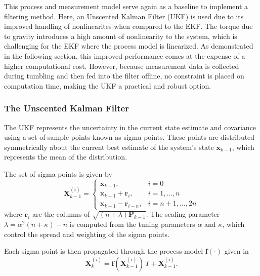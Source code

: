 This process and measurement model serve again as a baseline to implement a filtering method. Here, an Unscented Kalman Filter (UKF) is used due to its improved handling of nonlinearites when compared to the EKF. The torque due to gravity introduces a high amount of nonlinearity to the system, which is challenging for the EKF where the process model is linearized. As demonstrated in the following section, this improved performance comes at the expense of a higher computational cost. However, because measurement data is collected during tumbling and then fed into the filter offline, no constraint is placed on computation time, making the UKF a practical and robust option.

\subsubsection{The Unscented Kalman Filter}

The UKF represents the uncertainty in the current state estimate and covariance using a set of sample points known as sigma points. These points are distributed symmetrically about the current best estimate of the system's state $\bm{x}_{k-1}$, which represents the mean of the distribution. 

The set of sigma points is given by
\begin{equation}
    \bm{X}_{k-1}^{(i)} =
    \begin{cases}
        \bm{x}_{k-1}, & i = 0 \\[3pt]
        \bm{x}_{k-1} + \bm{r}_i, & i = 1,\dots,n\\[3pt]
        \bm{x}_{k-1} - \bm{r}_{i-n}, & i = n+1,\dots,2n
    \end{cases}
\end{equation}
where $\bm{r}_i$ are the columns of $\sqrt{(n+\lambda)\bm{P}_{k-1}}$. The scaling parameter $\lambda = \alpha^2(n+\kappa) - n$ is computed from the tuning parameters $\alpha$ and $\kappa$, which control the spread and weighting of the sigma points.

Each sigma point is then propagated through the process model $\bm{f}(\cdot)$ given in 
\begin{equation}
    \bm{X}_k^{(i)} = \bm{f}(\bm{X}_{k-1}^{(i)})\,T + \bm{X}_{k-1}^{(i)}.
\end{equation}

